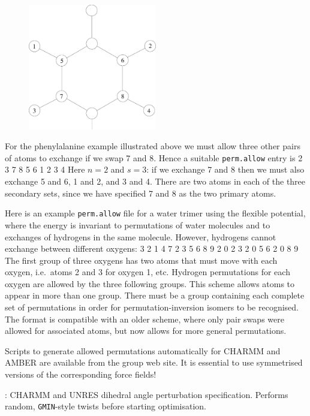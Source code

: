 {{{\begin{figure}[hH]
\centerline{\includegraphics[width=0.5\textwidth]{PHE.eps}}
\end{figure}

For the phenylalanine example illustrated above we must allow three other pairs of
atoms to exchange if we swap 7 and 8. Hence a suitable {\tt perm.allow} entry is
{
2 3
7 8 5 6 1 2 3 4
}
Here $n=2$ and $s=3$: if we exchange 7 and 8 then we must also exchange 5 and 6,
1 and 2, and 3 and 4. There are two atoms in each of the three secondary sets, 
since we have specified 7 and 8 as the two primary atoms.

Here is an example {\tt perm.allow} file for a water trimer using
the flexible {} potential, where the energy is invariant to permutations
of water molecules and to exchanges of hydrogens in the same molecule. However,
hydrogens cannot exchange between different oxygens:
{
3 2
1 4 7 2 3 5 6 8 9
2 0 
2 3
2 0 
5 6
2 0 
8 9
}
The first group of three oxygens has two atoms that must move with each oxygen,
i.e.~atoms 2 and 3 for oxygen 1, etc. Hydrogen permutations for each oxygen are
allowed by the three following groups. This scheme allows atoms to appear in more 
than one group. There must be a group containing each complete set of permutations
in order for permutation-inversion isomers to be recognised. The format
is compatible with an older scheme, where only pair swaps were allowed for
associated atoms, but now allows for more general permutations.

Scripts to generate allowed permutations automatically for CHARMM and AMBER are available from
the group web site. It is essential to use symmetrised versions of the corresponding
force fields! 

: CHARMM 
and UNRES dihedral angle perturbation specification.
Performs random, {\tt GMIN}-style twists before starting optimisation.

}}}
